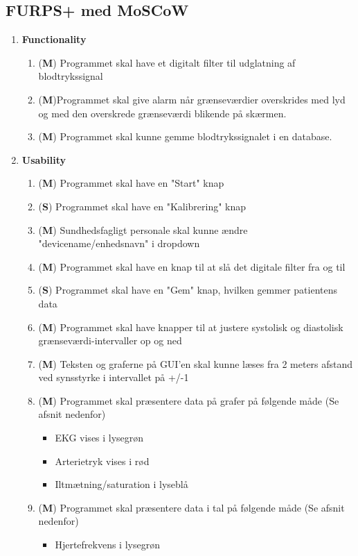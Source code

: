\subsection{FURPS+ med MoSCoW}
\begin{enumerate}
\item \textbf{Functionality}
\begin{enumerate}
\item (\textbf{M}) Programmet skal have et digitalt filter til udglatning af blodtrykssignal
\item (\textbf{M})Programmet skal give alarm når grænseværdier overskrides med lyd og med den overskrede grænseværdi blikende på skærmen.
\item (\textbf{M}) Programmet skal kunne gemme blodtrykssignalet i en database.
\end{enumerate}
\item \textbf{Usability}
\begin{enumerate}
\item (\textbf{M}) Programmet skal have en "Start" knap
\item (\textbf{S}) Programmet skal have en "Kalibrering" knap
\item (\textbf{M}) Sundhedsfagligt personale skal kunne ændre "devicename/enhedsnavn" i dropdown
\item (\textbf{M}) Programmet skal have en knap til at slå det digitale filter fra og til
\item (\textbf{S}) Programmet skal have en "Gem" knap, hvilken gemmer patientens data
\item (\textbf{M}) Programmet skal have knapper til at justere systolisk og diastolisk grænseværdi-intervaller op og ned
\item (\textbf{M}) Teksten og graferne på GUI’en skal kunne læses fra 2 meters afstand ved synsstyrke i intervallet på +/-1
\item (\textbf{M}) Programmet skal præsentere data på grafer på følgende måde (Se afsnit nedenfor)
\begin{itemize}
\item EKG vises i lysegrøn
\item Arterietryk vises i rød
\item Iltmætning/saturation i lyseblå
\end{itemize}
\item (\textbf{M}) Programmet skal præsentere data i tal på følgende måde (Se afsnit nedenfor)
\begin{itemize}
\item Hjertefrekvens i lysegrøn

\end{itemize}
\end{enumerate}
\end{enumerate}
